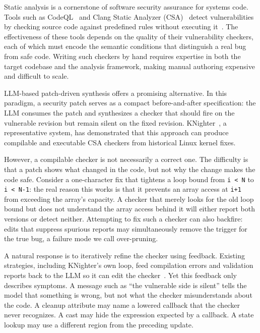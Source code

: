 Static analysis is a cornerstone of software security assurance for systems code.
Tools such as CodeQL~\cite{codeqlDocs} and Clang Static Analyzer (CSA)~\cite{clangsaDocs} detect vulnerabilities by checking source code against predefined rules without executing it~\cite{engler2001bugs,bessey2010coverity,calcagno2015infer,sadowski2015tricorder}.
The effectiveness of these tools depends on the quality of their vulnerability checkers, each of which must encode the semantic conditions that distinguish a real bug from safe code.
Writing such checkers by hand requires expertise in both the target codebase and the analysis framework, making manual authoring expensive and difficult to scale.

LLM-based patch-driven synthesis offers a promising alternative.
In this paradigm, a security patch serves as a compact before-and-after specification: the LLM consumes the patch and synthesizes a checker that should fire on the vulnerable revision but remain silent on the fixed revision.
KNighter~\cite{yang2025knighter}, a representative system, has demonstrated that this approach can produce compilable and executable CSA checkers from historical Linux kernel fixes.

However, a compilable checker is not necessarily a correct one.
The difficulty is that a patch shows what changed in the code, but not why the change makes the code safe.
Consider a one-character fix that tightens a loop bound from \lstinline|i < N| to \lstinline|i < N-1|: the real reason this works is that it prevents an array access at \lstinline|i+1| from exceeding the array's capacity.
A checker that merely looks for the old loop bound but does not understand the array access behind it will either report both versions or detect neither.
Attempting to fix such a checker can also backfire: edits that suppress spurious reports may simultaneously remove the trigger for the true bug, a failure mode we call over-pruning.

A natural response is to iteratively refine the checker using feedback.
Existing strategies, including KNighter's own loop, feed compilation errors and validation reports back to the LLM so it can edit the checker~\cite{yang2025knighter,madaan2023selfrefine,shinn2023reflexion}.
Yet this feedback only describes symptoms. A message such as ``the vulnerable side is silent'' tells the model that something is wrong, but not what the checker misunderstands about the code.
A cleanup attribute may name a lowered callback that the checker never recognizes. A cast may hide the expression expected by a callback. A state lookup may use a different region from the preceding update.

